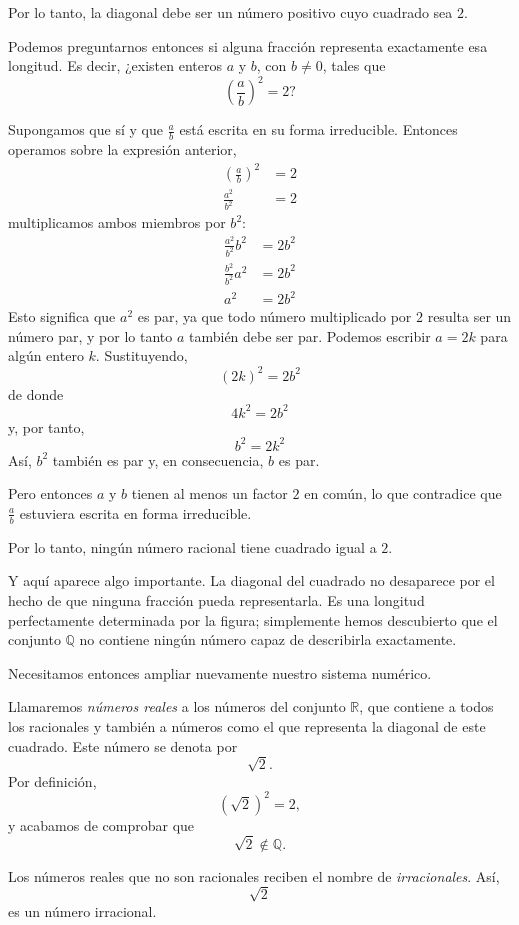 Por lo tanto, la diagonal debe ser un número positivo cuyo cuadrado sea \(2\).

Podemos preguntarnos entonces si alguna fracción representa exactamente esa longitud. Es decir, ¿existen enteros \(a\) y \(b\), con \(b\neq0\), tales que
\[
\left(\frac ab\right)^2=2?
\]

Supongamos que sí y que \(\frac ab\) está escrita en su forma irreducible. Entonces operamos sobre la expresión anterior, 
\begin{align*}
  \left(\frac ab\right)^2 &= 2 \\ 
  \frac{a^2}{b^2} &= 2 
\end{align*}
multiplicamos ambos miembros por \(b^2\):
\begin{align*}
  \frac{a^2}{b^2} b^2 &= 2b^2 \\
  \frac{b^2}{b^2} a^2 &= 2b^2 \\
  a^2&=2b^2
\end{align*}
Esto significa que \(a^2\) es par, ya que todo número multiplicado por \(2\) resulta ser un número par, y por lo tanto \(a\) también debe ser par. Podemos escribir \(a=2k\) para algún entero \(k\). Sustituyendo,
\[
(2k)^2=2b^2
\]
de donde
\[
4k^2=2b^2
\]
y, por tanto,
\[
b^2=2k^2
\]
Así, \(b^2\) también es par y, en consecuencia, \(b\) es par.

Pero entonces \(a\) y \(b\) tienen al menos un factor \(2\) en común, lo que contradice que \(\frac ab\) estuviera escrita en forma irreducible.

Por lo tanto, ningún número racional tiene cuadrado igual a \(2\).

Y aquí aparece algo importante. La diagonal del cuadrado no desaparece por el hecho de que ninguna fracción pueda representarla. Es una longitud perfectamente determinada por la figura; simplemente hemos descubierto que el conjunto \(\mathbb Q\) no contiene ningún número capaz de describirla exactamente.

Necesitamos entonces ampliar nuevamente nuestro sistema numérico.

Llamaremos \emph{números reales} a los números del conjunto \(\mathbb R\), que contiene a todos los racionales y también a números como el que representa la diagonal de este cuadrado. Este número se denota por
\[
\sqrt2.
\]
Por definición,
\[
\left(\sqrt2\right)^2=2,
\]
y acabamos de comprobar que
\[
\sqrt2\notin\mathbb Q.
\]

Los números reales que no son racionales reciben el nombre de \emph{irracionales}. Así,
\[
\sqrt2
\]
es un número irracional.

